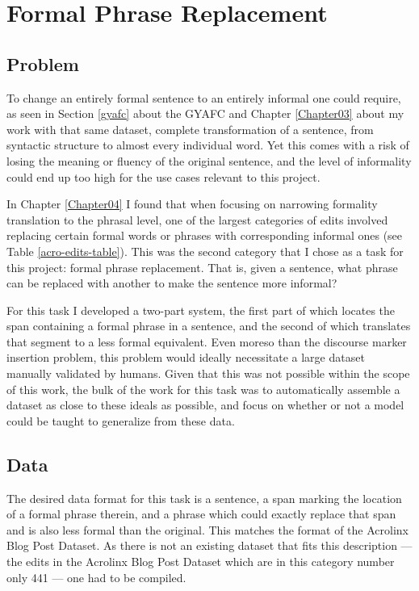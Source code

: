\chapter{Formal Phrase Replacement}

\label{Chapter06}

\section{Problem}

To change an entirely formal sentence to an entirely informal one could require, as seen in Section \ref{gyafc} about the GYAFC and Chapter \ref{Chapter03} about my work with that same dataset, complete transformation of a sentence, from syntactic structure to almost every individual word. Yet this comes with a risk of losing the meaning or fluency of the original sentence, and the level of informality could end up too high for the use cases relevant to this project.

In Chapter \ref{Chapter04} I found that when focusing on narrowing formality translation to the phrasal level, one of the largest categories of edits involved replacing certain formal words or phrases with corresponding informal ones (see Table \ref{acro-edits-table}). This was the second category that I chose as a task for this project: formal phrase replacement. That is, given a sentence, what phrase can be replaced with another to make the sentence more informal?

For this task I developed a two-part system, the first part of which locates the span containing a formal phrase in a sentence, and the second of which translates that segment to a less formal equivalent. Even moreso than the discourse marker insertion problem, this problem would ideally necessitate a large dataset manually validated by humans. Given that this was not possible within the scope of this work, the bulk of the work for this task was to automatically assemble a dataset as close to these ideals as possible, and focus on whether or not a model could be taught to generalize from these data.


\section{Data}

The desired data format for this task is a sentence, a span marking the location of a formal phrase therein, and a phrase which could exactly replace that span and is also less formal than the original. This matches the format of the Acrolinx Blog Post Dataset. As there is not an existing dataset that fits this description --- the edits in the Acrolinx Blog Post Dataset which are in this category number only 441 --- one had to be compiled.

